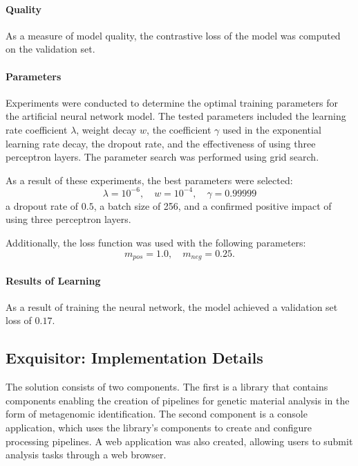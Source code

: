 \documentclass[biomedinformatics,article,submit,moreauthors]{Definitions/mdpi}
\begin{document}
                \paragraph{Quality}
                As a measure of model quality, the contrastive loss of the model was computed on the validation set.

                \paragraph{Parameters}
                Experiments were conducted to determine the optimal training parameters for the artificial neural network model. The tested parameters included the learning rate coefficient \( \lambda \), weight decay \( w \), the coefficient \( \gamma \) used in the exponential learning rate decay, the dropout rate, and the effectiveness of using three perceptron layers. The parameter search was performed using grid search.

                As a result of these experiments, the best parameters were selected:
                \[
                \lambda = 10^{-6}, \quad w = 10^{-4}, \quad \gamma = 0.99999
                \]
                a dropout rate of \( 0.5 \), a batch size of 256, and a confirmed positive impact of using three perceptron layers.

                Additionally, the loss function was used with the following parameters:
                \[
                m_{pos} = 1.0, \quad m_{neg} = 0.25.
                \]

                \paragraph{Results of Learning}
                As a result of training the neural network, the model achieved a validation set loss of $0.17$.

        \subsection{Exquisitor: Implementation Details}
            The solution consists of two components. The first is a library that contains components enabling the creation of pipelines for genetic material analysis in the form of metagenomic identification. The second component is a console application, which uses the library's components to create and configure processing pipelines. A web application was also created, allowing users to submit analysis tasks through a web browser.
\end{document}

